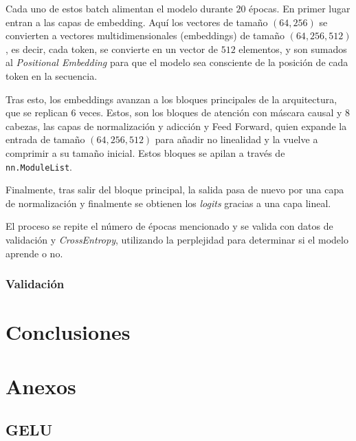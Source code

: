 \documentclass[11pt]{book}
\newcommand{\clearemptydoublepage}{\newpage{\pagestyle{empty}\cleardoublepage}}
\theoremstyle{plain}
\theoremstyle{definition}
\begin{document}
Cada uno de estos batch alimentan el modelo durante $20$ épocas. En primer lugar entran a las capas de embedding. Aquí los vectores de tamaño $(64,256)$ se convierten a vectores multidimensionales (embeddings) de tamaño $(64,256, 512)$, es decir, cada token, se convierte en un vector de $512$ elementos, y son sumados al \textit{Positional Embedding} para que el modelo sea consciente de la posición de cada token en la secuencia. 

Tras esto, los embeddings avanzan a los bloques principales de la arquitectura, que se replican $6$ veces. Estos, son los bloques de atención con máscara causal y 8 cabezas, las capas de normalización y adicción y Feed Forward, quien expande la entrada de tamaño $(64,256, 512)$ para añadir no linealidad y la vuelve a comprimir a su tamaño inicial. Estos bloques se apilan a través de \texttt{nn.ModuleList}. 

Finalmente, tras salir del bloque principal, la salida pasa de nuevo por una capa de normalización y finalmente se obtienen los \textit{logits} gracias a una capa lineal. 

El proceso se repite el número de épocas mencionado y se valida con datos de validación y \textit{CrossEntropy}, utilizando la perplejidad para determinar si el modelo aprende o no.


\subsection{Validación} \label{subsec:validacion}






\clearemptydoublepage

\chapter{Conclusiones}


\clearemptydoublepage

\printbibliography[title={Referencias Bibliográficas}]

\appendix 
\chapter{Anexos}

\section{GELU} \label{sec:gelu}
\end{document}
